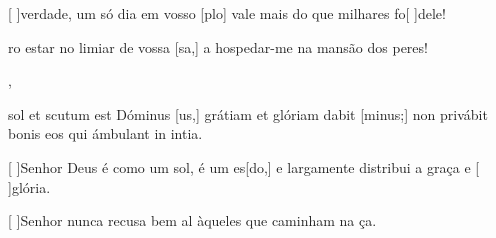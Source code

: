 {    {\item {}[ ]{ver}dade, um só dia em vosso [plo] vale mais do que milhares fo[ ]{de}le!~\Antiphona
    \item {}ro estar no limiar de vossa [sa,] a hospedar-me na mansão dos peres!~\Antiphona},
  {\item {} sol et scutum est Dóminus [us,] grátiam et glóriam dabit [minus;] non privábit bonis eos qui ámbulant in intia.~\Antiphona}%
    {\item {}[ ]{Se}nhor Deus é como um sol, é um es[do,] e largamente distribui a graça e [ ]{gló}ria.~\Antiphona
    \item {}[ ]{Se}nhor nunca recusa bem al àqueles que caminham na ça.~\Antiphona}
}